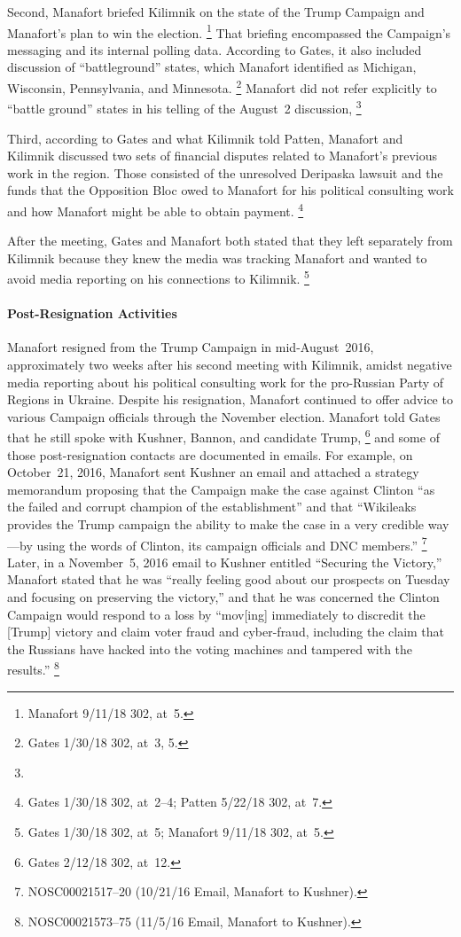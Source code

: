 Second, Manafort briefed Kilimnik on the state of the Trump Campaign and Manafort's plan to win the election.%
\footnote{Manafort 9/11/18 302, at~5.}
That briefing encompassed the Campaign's messaging and its internal polling data.
According to Gates, it also included discussion of ``battleground'' states, which Manafort identified as Michigan, Wisconsin, Pennsylvania, and Minnesota.%
\footnote{Gates 1/30/18 302, at~3, 5.}
Manafort did not refer explicitly to ``battle ground'' states in his telling of the August~2 discussion,
\footnote{}

Third, according to Gates and what Kilimnik told Patten, Manafort and Kilimnik discussed two sets of financial disputes related to Manafort's previous work in the region.
Those consisted of the unresolved Deripaska lawsuit and the funds that the Opposition Bloc owed to Manafort for his political consulting work and how Manafort might be able to obtain payment.%
\footnote{Gates 1/30/18 302, at~2--4;
Patten 5/22/18 302, at~7.}

After the meeting, Gates and Manafort both stated that they left separately from Kilimnik because they knew the media was tracking Manafort and wanted to avoid media reporting on his connections to Kilimnik.%
\footnote{Gates 1/30/18 302, at~5;
Manafort 9/11/18 302, at~5.}

\paragraph{Post-Resignation Activities}

Manafort resigned from the Trump Campaign in mid-August~2016, approximately two weeks after his second meeting with Kilimnik, amidst negative media reporting about his political consulting work for the pro-Russian Party of Regions in Ukraine.
Despite his resignation, Manafort continued to offer advice to various Campaign officials through the November election.
Manafort told Gates that he still spoke with Kushner, Bannon, and candidate Trump,%
\footnote{Gates 2/12/18 302, at~12.}
and some of those post-resignation contacts are documented in emails.
For example, on October~21, 2016, Manafort sent Kushner an email and attached a strategy memorandum proposing that the Campaign make the case against Clinton ``as the failed and corrupt champion of the establishment'' and that ``Wikileaks provides the Trump campaign the ability to make the case in a very credible way---by using the words of Clinton, its campaign officials and DNC members.''%
\footnote{NOSC00021517--20 (10/21/16 Email, Manafort to Kushner).}
Later, in a November~5, 2016 email to Kushner entitled ``Securing the Victory,'' Manafort stated that he was ``really feeling good about our prospects on Tuesday and focusing on preserving the victory,'' and that he was concerned the Clinton Campaign would respond to a loss by ``mov[ing] immediately to discredit the [Trump] victory and claim voter fraud and cyber-fraud, including the claim that the Russians have hacked into the voting machines and tampered with the results.''%
\footnote{NOSC00021573--75 (11/5/16 Email, Manafort to Kushner).}

